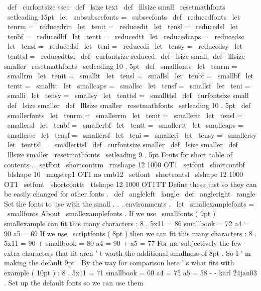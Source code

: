 {{{\
def
\
curfontsize
{
ssec
}
%
\
def
\
lsize
{
text
}
\
def
\
lllsize
{
small
}
%
\
resetmathfonts
\
setleading
{
15pt
}
}
\
let
\
subsubsecfonts
=
\
subsecfonts
\
def
\
reducedfonts
{
%
\
let
\
tenrm
=
\
reducedrm
\
let
\
tenit
=
\
reducedit
\
let
\
tensl
=
\
reducedsl
\
let
\
tenbf
=
\
reducedbf
\
let
\
tentt
=
\
reducedtt
\
let
\
reducedcaps
=
\
reducedsc
\
let
\
tensf
=
\
reducedsf
\
let
\
teni
=
\
reducedi
\
let
\
tensy
=
\
reducedsy
\
let
\
tenttsl
=
\
reducedttsl
\
def
\
curfontsize
{
reduced
}
%
\
def
\
lsize
{
small
}
\
def
\
lllsize
{
smaller
}
%
\
resetmathfonts
\
setleading
{
10
.
5pt
}
}
\
def
\
smallfonts
{
%
\
let
\
tenrm
=
\
smallrm
\
let
\
tenit
=
\
smallit
\
let
\
tensl
=
\
smallsl
\
let
\
tenbf
=
\
smallbf
\
let
\
tentt
=
\
smalltt
\
let
\
smallcaps
=
\
smallsc
\
let
\
tensf
=
\
smallsf
\
let
\
teni
=
\
smalli
\
let
\
tensy
=
\
smallsy
\
let
\
tenttsl
=
\
smallttsl
\
def
\
curfontsize
{
small
}
%
\
def
\
lsize
{
smaller
}
\
def
\
lllsize
{
smaller
}
%
\
resetmathfonts
\
setleading
{
10
.
5pt
}
}
\
def
\
smallerfonts
{
%
\
let
\
tenrm
=
\
smallerrm
\
let
\
tenit
=
\
smallerit
\
let
\
tensl
=
\
smallersl
\
let
\
tenbf
=
\
smallerbf
\
let
\
tentt
=
\
smallertt
\
let
\
smallcaps
=
\
smallersc
\
let
\
tensf
=
\
smallersf
\
let
\
teni
=
\
smalleri
\
let
\
tensy
=
\
smallersy
\
let
\
tenttsl
=
\
smallerttsl
\
def
\
curfontsize
{
smaller
}
%
\
def
\
lsize
{
smaller
}
\
def
\
lllsize
{
smaller
}
%
\
resetmathfonts
\
setleading
{
9
.
5pt
}
}
%
Fonts
for
short
table
of
contents
.
\
setfont
\
shortcontrm
\
rmshape
{
12
}
{
1000
}
{
OT1
}
\
setfont
\
shortcontbf
\
bfshape
{
10
}
{
\
magstep1
}
{
OT1
}
%
no
cmb12
\
setfont
\
shortcontsl
\
slshape
{
12
}
{
1000
}
{
OT1
}
\
setfont
\
shortconttt
\
ttshape
{
12
}
{
1000
}
{
OT1TT
}
%
Define
these
just
so
they
can
be
easily
changed
for
other
fonts
.
\
def
\
angleleft
{
\
langle
}
\
def
\
angleright
{
\
rangle
}
%
Set
the
fonts
to
use
with
the
small
.
.
.
environments
.
\
let
\
smallexamplefonts
=
\
smallfonts
%
About
\
smallexamplefonts
.
If
we
use
\
smallfonts
(
9pt
)
smallexample
%
can
fit
this
many
characters
:
%
8
.
5x11
=
86
smallbook
=
72
a4
=
90
a5
=
69
%
If
we
use
\
scriptfonts
(
8pt
)
then
we
can
fit
this
many
characters
:
%
8
.
5x11
=
90
+
smallbook
=
80
a4
=
90
+
a5
=
77
%
For
me
subjectively
the
few
extra
characters
that
fit
aren
'
t
worth
%
the
additional
smallness
of
8pt
.
So
I
'
m
making
the
default
9pt
.
%
%
By
the
way
for
comparison
here
'
s
what
fits
with
example
(
10pt
)
:
%
8
.
5x11
=
71
smallbook
=
60
a4
=
75
a5
=
58
%
-
-
karl
24jan03
.
%
Set
up
the
default
fonts
so
we
can
use
them
}}

